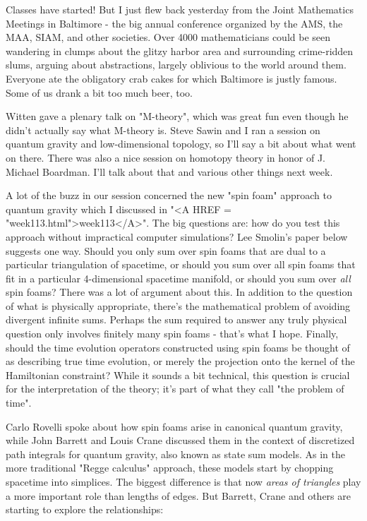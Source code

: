

Classes have started!  But I just flew back yesterday from the Joint
Mathematics Meetings in Baltimore - the big annual conference organized
by the AMS, the MAA, SIAM, and other societies.  Over 4000
mathematicians could be seen wandering in clumps about the glitzy harbor
area and surrounding crime-ridden slums, arguing about abstractions,
largely oblivious to the world around them.  Everyone ate the obligatory
crab cakes for which Baltimore is justly famous.  Some of us drank a bit
too much beer, too.  

Witten gave a plenary talk on "M-theory", which was great fun even
though he didn't actually say what M-theory is.  Steve Sawin and I ran a
session on quantum gravity and low-dimensional topology, so I'll say a
bit about what went on there.  There was also a nice session on homotopy
theory in honor of J. Michael Boardman.   I'll talk about that and
various other things next week.

A lot of the buzz in our session concerned the new "spin foam" approach
to quantum gravity which I discussed in "<A HREF = "week113.html">week113</A>".  The big questions
are: how do you test this approach without impractical computer
simulations?  Lee Smolin's paper below suggests one way.  Should you
only sum over spin foams that are dual to a particular triangulation of
spacetime, or should you sum over all spin foams that fit in a
particular 4-dimensional spacetime manifold, or should you sum over
\emph{all} spin foams?  There was a lot of argument about this.  In addition
to the question of what is physically appropriate, there's the
mathematical problem of avoiding divergent infinite sums.  Perhaps the
sum required to answer any truly physical question only involves
finitely many spin foams - that's what I hope.  Finally, should the
time evolution operators constructed using spin foams be thought of as
describing true time evolution, or merely the projection onto the kernel
of the Hamiltonian constraint?  While it sounds a bit technical, this
question is crucial for the interpretation of the theory; it's part of
what they call "the problem of time".  

Carlo Rovelli spoke about how spin foams arise in canonical quantum
gravity, while John Barrett and Louis Crane discussed them in the
context of discretized path integrals for quantum gravity, also known as
state sum models.  As in the more traditional "Regge calculus" approach,
these models start by chopping spacetime into simplices.  The biggest
difference is that now \emph{areas of triangles} play a more important role
than lengths of edges.  But Barrett, Crane and others are starting to
explore the relationships:

